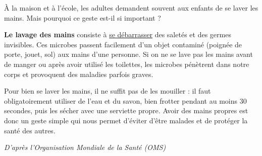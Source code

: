 \documentclass[a4paper,10pt]{article}
\begin{document}

\vspace{-3pt}

\vspace{-2pt}

\vspace{1pt}

\begin{tcolorbox}[
  enhanced,
  colback=primarylight!40,
  colframe=primary,
  arc=2mm,boxrule=0.8pt,
  top=5pt,bottom=5pt,left=8pt,right=8pt,
  title={\small\textbf{\textcolor{white}{\faFile*\ Texte : Des gestes simples pour une bonne hygiène corporelle}}},
  coltitle=white,colbacktitle=primary
]
{\small
À la maison et à l'école, les adultes demandent souvent aux enfants de se laver les mains. Mais pourquoi ce geste est-il si important ?

\textbf{Le lavage des mains} consiste à \underline{se débarrasser} des saletés et des germes invisibles. Ces microbes passent facilement d'un objet contaminé (poignée de porte, jouet, sol) aux mains d'une personne. Si on ne se lave pas les mains avant de manger ou après avoir utilisé les toilettes, les microbes pénètrent dans notre corps et provoquent des maladies parfois graves.

Pour bien se laver les mains, il ne suffit pas de les mouiller : il faut obligatoirement utiliser de l'eau et du savon, bien frotter pendant au moins 30 secondes, puis les sécher avec une serviette propre. Avoir des mains propres est donc un geste simple qui nous permet d'éviter d'être malades et de protéger la santé des autres.

\hfill\textit{\footnotesize D'après l'Organisation Mondiale de la Santé (OMS)}
}
\end{tcolorbox}

\vspace{3pt}
\end{document}
